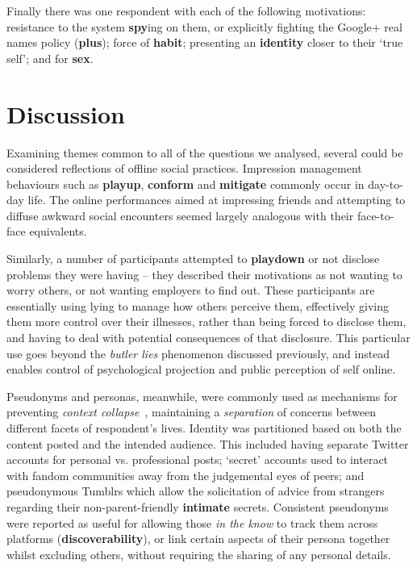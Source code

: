 \documentclass{sig-alternate}
\newcommand{\todo}[1]{\textbf{\color{red}TODO: #1}}
\newcommand{\stag}[1]{\textbf{#1}}
\begin{document}
Finally there was one respondent with each of the following motivations: resistance to the system \stag{spy}ing on them, or explicitly fighting the Google+ real names policy (\stag{plus}); force of \stag{habit}; presenting an \stag{identity} closer to their `true self'; and for \stag{sex}.



\section{Discussion}

Examining themes common to all of the questions we analysed, several could be considered reflections of offline social practices. Impression management behaviours such as \stag{playup}, \stag{conform} and \stag{mitigate} 
commonly occur in day-to-day life. The online performances aimed at impressing friends and attempting to diffuse awkward social encounters seemed largely analogous with their face-to-face equivalents.

Similarly, a number of participants attempted to \stag{playdown} or not disclose problems they were having --
they described their motivations as not wanting to worry others, or not wanting employers to find out.
These participants are essentially using lying to manage how others perceive them, effectively giving them more control over their illnesses, rather than being forced to disclose them, and having to deal with potential consequences of that disclosure. This particular use goes beyond the \emph{butler lies} phenomenon discussed previously, and instead enables control of psychological projection and public perception of self online.

Pseudonyms and personas, meanwhile, were commonly used as mechanisms for preventing \emph{context collapse}~\cite{hogan2010presentation,boyd2002faceted,Marwick2010}, maintaining a \emph{separation} of concerns between different facets of respondent's lives. Identity was partitioned based on both the content posted and the intended audience. This included having separate Twitter accounts for personal vs. professional posts; `secret' accounts used to interact with fandom communities away from the judgemental eyes of peers; and pseudonymous Tumblrs which allow the solicitation of advice from strangers regarding their non-parent-friendly \stag{intimate} secrets.  Consistent pseudonyms were reported as useful for allowing those \emph{in the know} to track them across platforms (\stag{discoverability}), or link certain aspects of their persona together whilst excluding others, without requiring the sharing of any personal details. 
\end{document}
